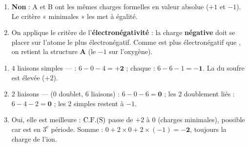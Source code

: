 \documentclass[11pt,a4paper]{article}
\begin{document}
\begin{corrige}
\begin{enumerate}[label=\alph*)]
  \item \textbf{Non} : A et B ont les mêmes charges formelles en valeur absolue ($+1$ et $-1$).
        Le critère « \CF{} minimales » les met à égalité.
  \item On applique le critère de l'\textbf{électronégativité} : la charge \textbf{négative} doit
        se placer sur l'atome le plus électronégatif. Comme  est plus électronégatif que
        , on retient la structure \textbf{A} (le $-1$ sur l'oxygène).
\end{enumerate}
\end{corrige}

\begin{corrige}
\begin{enumerate}[label=\alph*)]
  \item $4$ liaisons simples —  : $6 - 0 - 4 = \mathbf{+2}$ ; chaque  :
        $6 - 6 - 1 = \mathbf{-1}$. La \CF{} du soufre est élevée ($+2$).
  \item $2$ liaisons  —  ($0$ doublet, $6$ liaisons) : $6 - 0 - 6 = \mathbf{0}$ ;
        les $2$  doublement liés : $6 - 4 - 2 = \mathbf{0}$ ; les $2$  simples restent
        à $-1$.
  \item Oui, elle est meilleure : $\CF(\ce{S})$ passe de $+2$ à $0$ (charges minimales), possible
        car  est en $3^{\text{e}}$ période. Somme : $0 + 2\times 0 + 2\times(-1) = \mathbf{-2}$,
        toujours la charge de l'ion. \checkmark
\end{enumerate}
\end{corrige}
\end{document}
